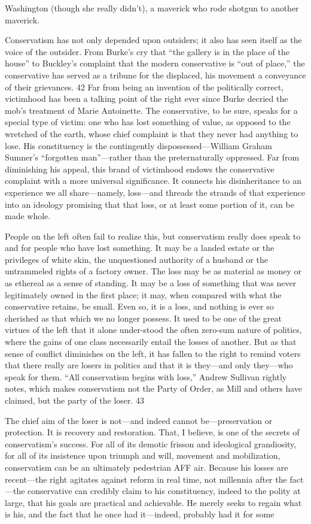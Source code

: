 Washington (though she really didn’t), a maverick who rode shotgun to another maverick.{\par} Conservatism has not only depended upon outsiders; it also has seen itself as the voice of the outsider. From Burke’s cry that “the gallery is in the place of the house” to Buckley’s complaint that the modern conservative is “out of place,” the conservative has served as a tribune for the displaced, his movement a conveyance of their grievances. {\color{blue} 42 } Far from being an invention of the politically correct, victimhood has been a talking point of the right ever since Burke decried the mob’s treatment of Marie Antoinette. The conservative, to be sure, speaks for a special type of victim: one who has lost something of value, as opposed to the wretched of the earth, whose chief complaint is that they never had anything to lose. His constituency is the contingently dispossessed—William Graham Sumner’s “forgotten man”—rather than the preternaturally oppressed. Far from diminishing his appeal, this brand of victimhood endows the conservative complaint with a more universal significance. It connects his disinheritance to an experience we all share—namely, loss—and threads the strands of that experience into an ideology promising that that loss, or at least some portion of it, can be made whole.{\par} People on the left often fail to realize this, but conservatism really does speak to and for people who have lost something. It may be a landed estate or the privileges of white skin, the unquestioned authority of a husband or the untrammeled rights of a factory owner. The loss may be as material as money or as ethereal as a sense of standing. It may be a loss of something that was never legitimately owned in the first place; it may, when compared with what the conservative retains, be small. Even so, it is a loss, and nothing is ever so cherished as that which we no longer possess. It used to be one of the great virtues of the left that it alone under-stood the often zero-sum nature of politics, where the gains of one class necessarily entail the losses of another. But as that sense of conflict diminishes on the left, it has fallen to the right to remind voters that there really are losers in politics and that it is they—and only they—who speak for them. “All conservatism begins with loss,” Andrew Sullivan rightly notes, which makes conservatism not the Party of Order, as Mill and others have claimed, but the party of the loser. {\color{blue} 43 } {\par} The chief aim of the loser is not—and indeed cannot be—preservation or protection. It is recovery and restoration. That, I believe, is one of the secrets of conservatism’s success. For all of its demotic frisson and ideological grandiosity, for all of its insistence upon triumph and will, movement and mobilization, conservatism can be an ultimately pedestrian AFF air. Because his losses are recent—the right agitates against reform in real time, not millennia after the fact—the conservative can credibly claim to his constituency, indeed to the polity at large, that his goals are practical and achievable. He merely seeks to regain what is his, and the fact that he once had it—indeed, probably had it for some 